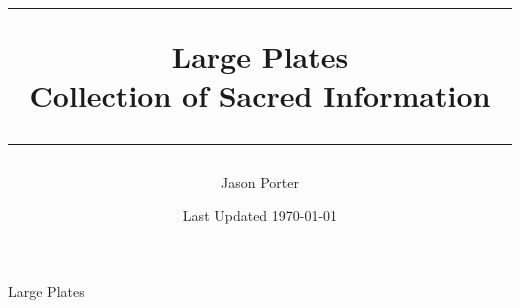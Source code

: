 \documentclass[A4]{article}
\begin{document}
\begin{titlepage}
\title{\hrule \vspace{1 em}
\Huge Large Plates\\
\Large Collection of Sacred Information\\
\vspace{1 em}
\hrule}
\author{Jason Porter}
\date{Last Updated \today}
\maketitle
\thispagestyle{empty}
\end{titlepage}

\tableofcontents
\newpage

\begin{center}
\Huge Large Plates
\end{center}










\printindex
\end{document}
